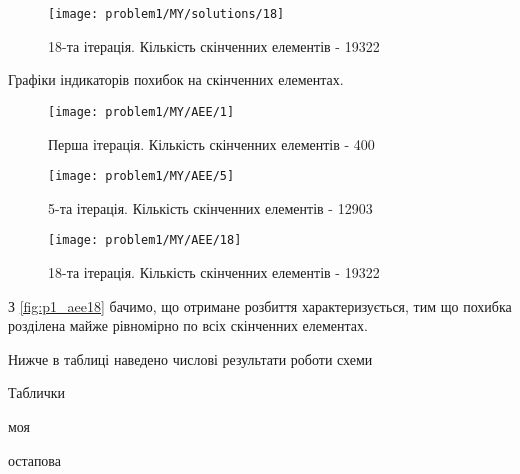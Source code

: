 \begin{figure}[H]
	\centering
    \texttt{[image: problem1/MY/solutions/18]}
    \caption{18-та ітерація. Кількість скінченних елементів - 19322}
    \label{fig:p1_solution18}
\end{figure}

Графіки індикаторів похибок на скінченних елементах.

\begin{figure}[H]
	\centering
    \texttt{[image: problem1/MY/AEE/1]}
    \caption{Перша ітерація. Кількість скінченних елементів - 400}
    \label{fig:p1_aee1}
\end{figure}

\begin{figure}[H]
	\centering
    \texttt{[image: problem1/MY/AEE/5]}
    \caption{5-та ітерація. Кількість скінченних елементів - 12903}
    \label{fig:p1_aee5}
\end{figure}

\begin{figure}[H]
	\centering
    \texttt{[image: problem1/MY/AEE/18]}
    \caption{18-та ітерація. Кількість скінченних елементів - 19322}
    \label{fig:p1_aee18}
\end{figure}

З \autoref{fig:p1_aee18} бачимо, що отримане розбиття характеризується, тим що похибка розділена майже рівномірно по всіх скінченних елементах.

Нижче в таблиці наведено числові результати роботи схеми



Таблички

моя

остапова
